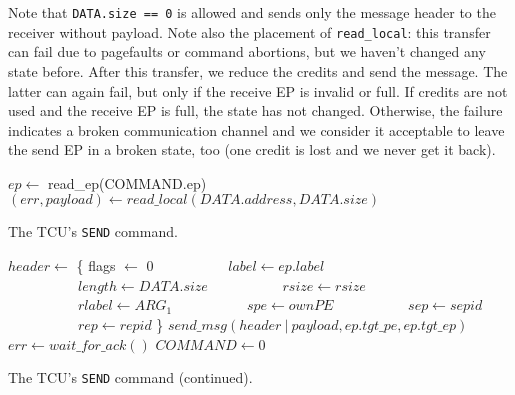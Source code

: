 Note that \texttt{DATA.size == 0} is allowed and sends only the message header to the receiver
without payload. Note also the placement of \texttt{read\_local}: this transfer can fail due to
pagefaults or command abortions, but we haven't changed any state before. After this transfer, we
reduce the credits and send the message. The latter can again fail, but only if the receive EP is
invalid or full. If credits are not used and the receive EP is full, the state has not changed.
Otherwise, the failure indicates a broken communication channel and we consider it acceptable to
leave the send EP in a broken state, too (one credit is lost and we never get it back).

\begin{algorithm}
    $ep \gets$ read\_ep(COMMAND.ep)\;
    \extend{}
    \BlankLine
    \BlankLine
    $(err, payload) \gets read\_local(DATA.address, DATA.size)$\;
    \extend{}
    \BlankLine
    \caption{The TCU's \texttt{SEND} command.}
\end{algorithm}

\begin{algorithm}
    \setcounter{AlgoLine}{29}
    $header \gets$ \{ flags $\gets$ 0\;
    $\quad\quad\quad\quad\quad label \gets ep.label$\;
    $\quad\quad\quad\quad\quad length \gets DATA.size$\;
    $\quad\quad\quad\quad\quad rsize \gets rsize$\;
    $\quad\quad\quad\quad\quad rlabel \gets ARG_1$\;
    $\quad\quad\quad\quad\quad spe \gets ownPE$\;
    $\quad\quad\quad\quad\quad sep \gets sepid$\;
    $\quad\quad\quad\quad\quad rep \gets repid$ \}\;
    $send\_msg(header\ |\ payload, ep.tgt\_pe, ep.tgt\_ep)$\;
    $err \gets wait\_for\_ack()$\;
    \BlankLine
    $COMMAND \gets 0$\;
    \caption{The TCU's \texttt{SEND} command (continued).}
\end{algorithm}

